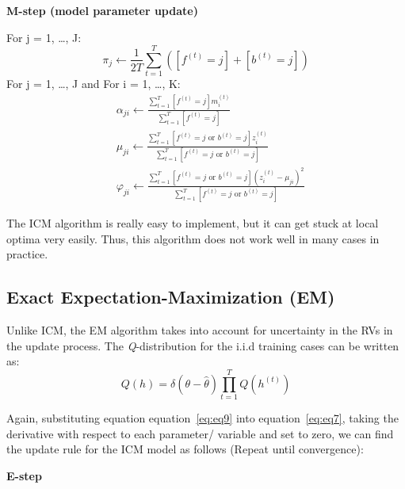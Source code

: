 \documentclass{article} %
\begin{document}
\textbf{M-step (model parameter update)}

For j = 1, \ldots , J: 
\begin{equation*}
\pi_j \leftarrow \frac{1}{2T}\sum_{t=1}^T([f^{(t)} = j] + [b^{(t)} = j])
\end{equation*}
For j = 1, \ldots , J and For i = 1, \ldots , K: 
\begin{align*} 
&\alpha_{ji} \leftarrow \frac{\sum_{t=1}^T [f^{(t)} = j]m_i^{(t)}}{\sum_{t=1}^T [f^{(t)} = j]} \\
&\mu_{ji} \leftarrow \frac{\sum_{t=1}^T [f^{(t)} = j \text{ or } b^{(t)} = j ]z_i^{(t)}}{\sum_{t=1}^T [f^{(t)} = j \text{ or } b^{(t)} = j]} \\
&\varphi_{ji} \leftarrow \frac{\sum_{t=1}^T [f^{(t)} = j \text{ or } b^{(t)} = j ](z_i^{(t)}-\mu_{ji})^2}{\sum_{t=1}^T [f^{(t)} = j \text{ or } b^{(t)} = j]} 
\end{align*} 

The ICM algorithm is really easy to implement, but it can get stuck at local optima very easily. Thus, this algorithm does not work well in many cases in practice.

\subsection{Exact Expectation-Maximization (EM)}
\label{exact_em}

Unlike ICM, the EM algorithm takes into account for uncertainty in the RVs in the update process. The \textit{Q}-distribution for the i.i.d training cases can be written as:
\begin{equation}
Q(h) = \delta(\theta-\hat{\theta})\prod_{t=1}^TQ(h^{(t)})
\label{eq:eq9}
\end{equation}

Again, substituting equation equation~\ref{eq:eq9} into equation~\ref{eq:eq7}, taking the derivative with respect to each parameter/ variable and set to zero, we can find the update rule for the ICM model as follows (Repeat until convergence):

\textbf{E-step}
\end{document}
